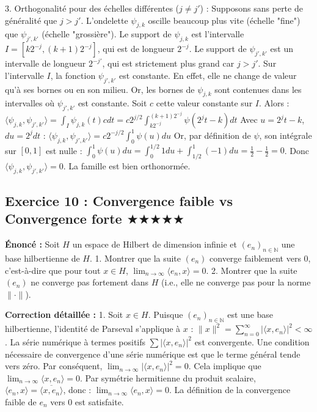 \documentclass[11pt,a4paper]{article}
\begin{document}
3. \textit{}Orthogonalité pour des échelles différentes ($j \neq j'$) :\textit{}
   Supposons sans perte de généralité que $j > j'$. L'ondelette $\psi_{j,k}$ oscille beaucoup plus vite (échelle "fine") que $\psi_{j',k'}$ (échelle "grossière").
   Le support de $\psi_{j,k}$ est l'intervalle $I = [k 2^{-j}, (k+1) 2^{-j}]$, qui est de longueur $2^{-j}$.
   Le support de $\psi_{j',k'}$ est un intervalle de longueur $2^{-j'}$, qui est strictement plus grand car $j > j'$.
   Sur l'intervalle $I$, la fonction $\psi_{j',k'}$ est constante. En effet, elle ne change de valeur qu'à ses bornes ou en son milieu. Or, les bornes de $\psi_{j,k}$ sont contenues dans les intervalles où $\psi_{j',k'}$ est constante.
   Soit $c$ cette valeur constante sur $I$. Alors :
   $\langle \psi_{j,k}, \psi_{j',k'} \rangle = \int_I \psi_{j,k}(t) c dt = c 2^{j/2} \int_{k 2^{-j}}^{(k+1) 2^{-j}} \psi(2^j t - k) dt$
   Avec $u = 2^j t - k$, $du = 2^j dt$ :
   $\langle \psi_{j,k}, \psi_{j',k'} \rangle = c 2^{-j/2} \int_0^1 \psi(u) du$
   Or, par définition de $\psi$, son intégrale sur $[0, 1]$ est nulle :
   $\int_0^1 \psi(u) du = \int_0^{1/2} 1 du + \int_{1/2}^1 (-1) du = \frac{1}{2} - \frac{1}{2} = 0$.
   Donc $\langle \psi_{j,k}, \psi_{j',k'} \rangle = 0$.
   La famille est bien orthonormée.


\subsection*{Exercice 10 : Convergence faible vs Convergence forte $\bigstar\bigstar\bigstar\bigstar\bigstar$}

\textbf{Énoncé :}
Soit $H$ un espace de Hilbert de dimension infinie et $(e_n)_{n \in \mathbb{N}}$ une base hilbertienne de $H$.
1. Montrer que la suite $(e_n)$ converge faiblement vers $0$, c'est-à-dire que pour tout $x \in H$, $\lim_{n \to \infty} \langle e_n, x \rangle = 0$.
2. Montrer que la suite $(e_n)$ ne converge pas fortement dans $H$ (i.e., elle ne converge pas pour la norme $\| \cdot \|$).

\textbf{Correction détaillée :}
1. Soit $x \in H$. Puisque $(e_n)_{n \in \mathbb{N}}$ est une base hilbertienne, l'identité de Parseval s'applique à $x$ :
   $\|x\|^2 = \sum_{n=0}^\infty |\langle x, e_n \rangle|^2 < \infty$.
   La série numérique à termes positifs $\sum |\langle x, e_n \rangle|^2$ est convergente.
   Une condition nécessaire de convergence d'une série numérique est que le terme général tende vers zéro.
   Par conséquent, $\lim_{n \to \infty} |\langle x, e_n \rangle|^2 = 0$.
   Cela implique que $\lim_{n \to \infty} \langle x, e_n \rangle = 0$.
   Par symétrie hermitienne du produit scalaire, $\langle e_n, x \rangle = \overline{\langle x, e_n \rangle}$, donc :
   $\lim_{n \to \infty} \langle e_n, x \rangle = 0$.
   La définition de la convergence faible de $e_n$ vers $0$ est satisfaite.
\end{document}
